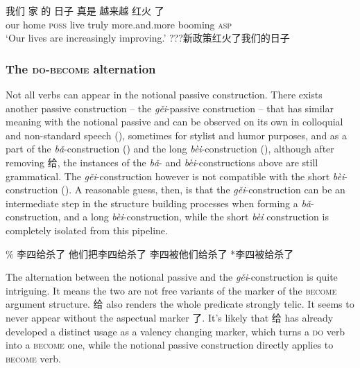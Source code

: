 \documentclass[UTF8, a4paper, oneside, scheme=plain]{ctexrep}
\newcommand{\corpus}[1]{\emph{#1}}
\newcommand{\translate}[1]{`#1'}
\newcommand*{\category}[1]{\textsc{#1}}
\begin{document}
\begin{exe}
    \ex\label{ex:verb-phrase.be-become.2} 
    \gll 我们 家 的 日子 真是 越来越 红火 了 \\
    our home \category{poss} live truly more.and.more booming \category{asp} \\
    \glt \translate{Our lives are increasingly improving.}
    \ex\label{ex:verb-phrase.be-become.cause-2} ???新政策红火了我们的日子
\end{exe}

\subsubsection{The \category{do}-\category{become} alternation}\label{sec:ver-phrase.gei}


Not all verbs can appear in the notional passive construction.
There exists another passive construction -- the \corpus{gěi}-passive construction -- 
that has similar meaning with the notional passive and
can be observed on its own 
in colloquial and non-standard speech
(),
sometimes for stylist and humor purposes,
and as a part of the \corpus{bǎ}-construction
()
and the long \corpus{bèi}-construction
(),
although after removing 给,
the instances of the \corpus{bǎ}- and \corpus{bèi}-constructions above 
are still grammatical.
The \corpus{gěi}-construction however is not compatible 
with the short \corpus{bèi}-construction
().
A reasonable guess, then, 
is that the \corpus{gěi}-construction can be an intermediate step 
in the structure building processes when forming a 
\corpus{bǎ}-construction,
and a long \corpus{bèi}-construction,
while the short \corpus{bèi} construction is completely isolated 
from this pipeline.

\begin{exe}
    \ex\label{ex:verb-phrase.gei.1} \% 李四给杀了
    \ex\label{ex:verb-phrase.gei.ba-1} 他们把李四给杀了
    \ex\label{ex:verb-phrase.gei.bei-1} 李四被他们给杀了
    \ex\label{ex:verb-phrase.gei.bei-2} *李四被给杀了
\end{exe}

The alternation between the notional passive and the \corpus{gěi}-construction 
is quite intriguing.
It means the two are not free variants of the marker of the \category{become} argument structure.
给 also renders the whole predicate strongly telic.
It seems to never appear without the aspectual marker 了.
It's likely that 给 has already developed a distinct usage 
as a valency changing marker, 
which turns a \category{do} verb into a \category{become} one,
while the notional passive construction directly applies to \category{become} verb.
\end{document}

